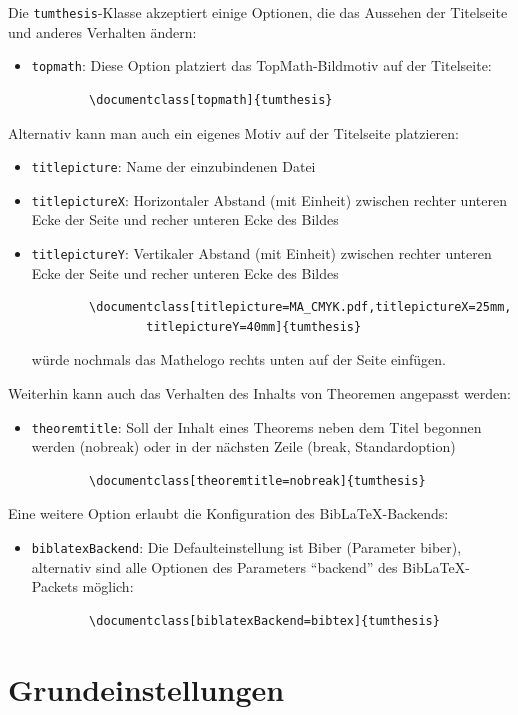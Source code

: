 Die \texttt{tumthesis}-Klasse akzeptiert einige Optionen, die das Aussehen der Titelseite und anderes Verhalten ändern:
\begin{itemize}
	\item \texttt{topmath}: Diese Option platziert das TopMath-Bildmotiv auf der Titelseite:
		\begin{verbatim}
		\documentclass[topmath]{tumthesis}
		\end{verbatim}
\end{itemize}
Alternativ kann man auch ein eigenes Motiv auf der Titelseite platzieren:
\begin{itemize}
	\item \texttt{titlepicture}: Name der einzubindenen Datei
	\item \texttt{titlepictureX}: Horizontaler Abstand (mit Einheit) zwischen rechter unteren Ecke der Seite und recher unteren Ecke des Bildes
	\item \texttt{titlepictureY}: Vertikaler Abstand (mit Einheit) zwischen rechter unteren Ecke der Seite und recher unteren Ecke des Bildes
		\begin{verbatim}
		\documentclass[titlepicture=MA_CMYK.pdf,titlepictureX=25mm,
				titlepictureY=40mm]{tumthesis}
		\end{verbatim}
        würde nochmals das Mathelogo rechts unten auf der Seite einfügen.
\end{itemize}
Weiterhin kann auch das Verhalten des Inhalts von Theoremen angepasst werden:
\begin{itemize}
	\item \texttt{theoremtitle}: Soll der Inhalt eines Theorems neben dem Titel begonnen werden (nobreak) oder in der nächsten Zeile (break, Standardoption)
		\begin{verbatim}
		\documentclass[theoremtitle=nobreak]{tumthesis}
		\end{verbatim}
\end{itemize}
Eine weitere Option erlaubt die Konfiguration des BibLaTeX-Backends:
\begin{itemize}
	\item \texttt{biblatexBackend}: Die Defaulteinstellung ist Biber (Parameter biber), alternativ sind alle Optionen des Parameters \enquote{backend} des BibLaTeX-Packets möglich:
		\begin{verbatim}
		\documentclass[biblatexBackend=bibtex]{tumthesis}
		\end{verbatim}
\end{itemize}

\section{Grundeinstellungen}
\label{sec:intro:grundeinstellungen}

